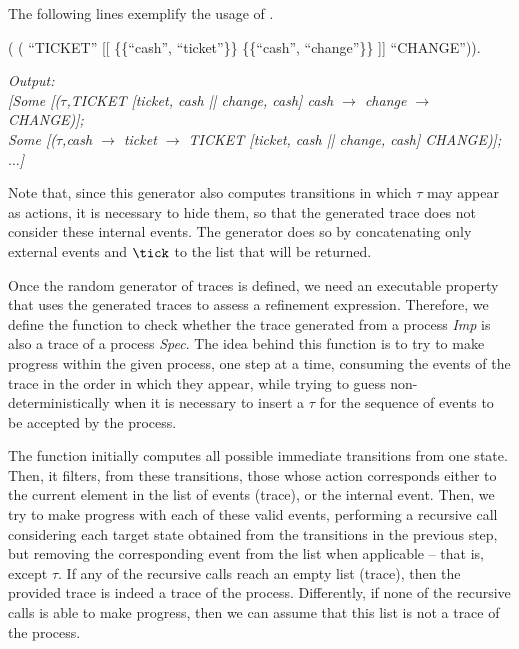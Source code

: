\noindent The following lines exemplify the usage of .

\begin{coqdoccode}
	\coqdocnoindent
	 ( \coqdoceol
	\coqdocindent{1.00em}
	( ``TICKET''\coqdoceol
	\coqdocindent{1.40em} [[ \{\{``cash'', ``ticket''\}\}  \{\{``cash'', ``change''\}\} ]]\coqdoceol
	\coqdocindent{1.40em} ``CHANGE'')).\coqdoceol
\end{coqdoccode}

\begin{tabbing}
	\emph{Output:}\\
	\emph{[Some [($ \tau $,TICKET [{ticket, cash} || {change, cash}] cash $ \rightarrow $ change $ \rightarrow $ CHANGE)];}\\
	\emph{Some [($ \tau $,cash $ \rightarrow $ ticket $ \rightarrow $ TICKET [{ticket, cash} || {change, cash}] CHANGE)]; $\dots$]}
\end{tabbing}

Note that, since this generator also computes transitions in which $ \tau $ may appear as actions, it is necessary to hide them, so that the generated trace does not consider these internal events. The generator  does so by concatenating only external events and $\tick$ to the list that will be returned.

Once the random generator of traces is defined, we need an executable property that uses the generated traces to assess a refinement expression. Therefore, we define the function  to check whether the trace generated from a process \emph{Imp} is also a trace of a process \emph{Spec}. The idea behind this function is to try to make progress within the given process, one step at a time, consuming the events of the trace in the order in which they appear, while trying to guess non-deterministically when it is necessary to insert a $ \tau $ for the sequence of events to be accepted by the process.

The function  initially computes all possible immediate transitions from one state. Then, it filters, from these transitions, those whose action corresponds either to the current element in the list of events (trace), or the internal event. Then, we try to make progress with each of these valid events, performing a recursive call considering each target state obtained from the transitions in the previous step, but removing the corresponding event from the list when applicable -- that is, except $ \tau $. If any of the recursive calls reach an empty list (trace), then the provided trace is indeed a trace of the process. Differently, if none of the recursive calls is able to make progress, then we can assume that this list is not a trace of the process.

